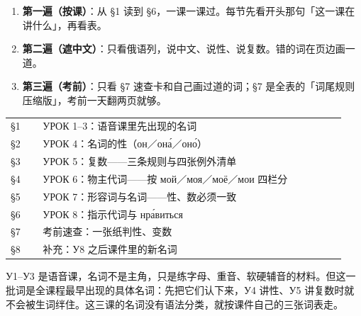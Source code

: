 \documentclass[11pt]{ctexart}
\begin{document}

\begin{enumerate}
\item \textbf{第一遍（按课）}：从 §1 读到 §6，一课一课过。每节先看开头那句「这一课在讲什么」，再看表。
\item \textbf{第二遍（遮中文）}：只看俄语列，说中文、说性、说复数。错的词在页边画一道。
\item \textbf{第三遍（考前）}：只看 §7 速查卡和自己画过道的词；§7 是全表的「词尾规则压缩版」，考前一天翻两页就够。
\end{enumerate}

\begin{minipage}{\linewidth}
\tabtop
\begin{tabular}{@{}p{0.09\linewidth}p{0.76\linewidth}p{0.09\linewidth}@{}}
§1 & УРОК 1–3：语音课里先出现的名词 & \pageref{sec:1} \\
§2 & УРОК 4：名词的性（он／она́／оно́） & \pageref{sec:2} \\
§3 & УРОК 5：复数——三条规则与四张例外清单 & \pageref{sec:3} \\
§4 & УРОК 6：物主代词——按 мой／моя／моё／мои 四栏分 & \pageref{sec:4} \\
§5 & УРОК 7：形容词与名词——性、数必须一致 & \pageref{sec:5} \\
§6 & УРОК 8：指示代词与 нра́виться & \pageref{sec:6} \\
§7 & 考前速查：一张纸判性、变数 & \pageref{sec:7} \\
§8 & 补充：У8 之后课件里的新名词 & \pageref{sec:8} \\
\end{tabular}
\tabbot
\end{minipage}
\label{sec:1}
У1–У3 是语音课，名词不是主角，只是练字母、重音、软硬辅音的材料。但这一批词是全课程最早出现的具体名词：先把它们认下来，У4 讲性、У5 讲复数时就不会被生词绊住。这三课的名词没有语法分类，就按课件自己的三张词表走。
\end{document}
